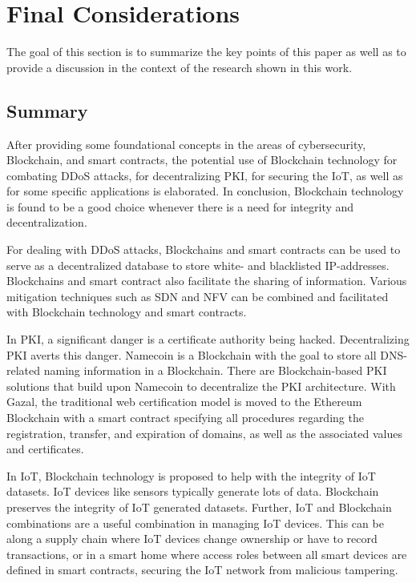 \section{Final Considerations}

The goal of this section is to summarize the key points of this paper as well as to provide a discussion in the context of the research shown in this work.

\subsection{Summary}

After providing some foundational concepts in the areas of cybersecurity, Blockchain, and smart contracts, the potential use of Blockchain technology for combating DDoS attacks, for decentralizing PKI, for securing the IoT, as well as for some specific applications is elaborated. In conclusion, Blockchain technology is found to be a good choice whenever there is a need for integrity and decentralization.

For dealing with DDoS attacks, Blockchains and smart contracts can be used to serve as a decentralized database to store white- and blacklisted IP-addresses. Blockchains and smart contract also facilitate the sharing of information.
Various mitigation techniques such as SDN and NFV can be combined and facilitated with Blockchain technology and smart contracts.

In PKI, a significant danger is a certificate authority being hacked. Decentralizing PKI averts this danger. Namecoin is a Blockchain with the goal to store all DNS-related naming information in a Blockchain. There are Blockchain-based PKI solutions that build upon Namecoin to decentralize the PKI architecture.
With Gazal, the traditional web certification model is moved to the Ethereum Blockchain with a smart contract specifying all procedures regarding the registration, transfer, and expiration of domains, as well as the associated values and certificates.

In IoT, Blockchain technology is proposed to help with the integrity of IoT datasets. IoT devices like sensors typically generate lots of data. Blockchain preserves the integrity of IoT generated datasets. Further, IoT and Blockchain combinations are a useful
combination in managing IoT devices. This can be along a supply chain where IoT devices change ownership or have to record transactions, or in a smart home
where access roles between all smart devices are defined in smart contracts, securing the IoT network from malicious tampering.

